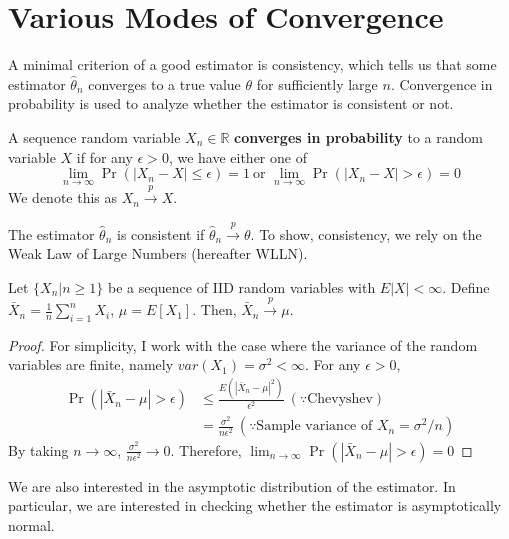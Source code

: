 \section{Various Modes of Convergence}
A minimal criterion of a good estimator is consistency, which tells us that some estimator $\hat{\theta}_n$ converges to a true value $\theta$ for sufficiently large $n$. Convergence in probability is used to analyze whether the estimator is consistent or not. 
\begin{mdframed}[backgroundcolor=blue!5] 
\begin{definition}
A sequence random variable $X_n\in \mathbb{R}$ \textbf{converges in probability} to a random variable $X$ if for any $\epsilon>0$, we have either one of 
\[
\lim_{n\to\infty}\Pr(|X_n-X|\leq\epsilon)=1 \ \text{or }\lim_{n\to\infty}\Pr(|X_n-X|>\epsilon)=0
\]
We denote this as $X_n\xrightarrow{p}X$. 
\end{definition}
\end{mdframed} \par
The estimator $\hat{\theta}_n$ is consistent if $\hat{\theta}_n\xrightarrow{p}\theta$. To show, consistency, we rely on the Weak Law of Large Numbers (hereafter WLLN). 
\begin{mdframed}[backgroundcolor=green!5] 
\begin{theorem}[WLLN] Let $\{X_n|n\geq1\}$ be a sequence of IID random variables with $E|X|<\infty$. Define $\bar{X}_n=\frac{1}{n}\sum_{i=1}^nX_i$, $\mu=E[X_1]$. Then, $\bar{X}_n\xrightarrow{p}\mu$. 
\begin{proof}
For simplicity, I work with the case where the variance of the random variables are finite, namely $var(X_1)=\sigma^2<\infty$. For any $\epsilon>0$, 
\[
\begin{aligned}
\Pr(|\bar{X}_n-\mu|>\epsilon)&\leq\frac{E(|\bar{X}_n-\mu|^2)}{\epsilon^2} \ (\because \text{Chevyshev})\\
&=\frac{\sigma^2}{n\epsilon^2} \ (\because\text{Sample variance of $X_n$}=\sigma^2/n)
\end{aligned}
\]
By taking $n\to\infty$, $\frac{\sigma^2}{n\epsilon^2}\to0$. Therefore, $\lim_{n\to\infty}\Pr(|\bar{X}_n-\mu|>\epsilon)=0$
\end{proof}
\end{theorem}
\end{mdframed}\par
We are also interested in the asymptotic distribution of the estimator. In particular, we are interested in checking whether the estimator is asymptotically normal. 
